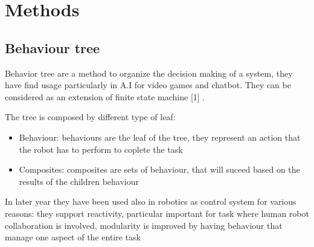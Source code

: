 \chapter*{Methods}

\section*{Behaviour tree}
Behavior tree are a method to organize the decision making of a system, they have find usage particularly in A.I for
video games and chatbot. They can be considered as an extension of finite state machine [1] . 

The tree is  composed by different type of leaf: 
\begin{itemize}
    \item Behaviour: behaviours are the leaf of the tree, they represent an action that the robot has to perform 
                     to coplete the task
    \item Composites: composites are sets of behaviour, that will suceed based on the results of the children behaviour 
\end{itemize}



In later year they have been used also in robotics as control system for various reasons: they support reactivity, 
particular important for task where human robot collaboration is involved, modularity is improved by having 
behaviour that manage one aspect of the entire task 